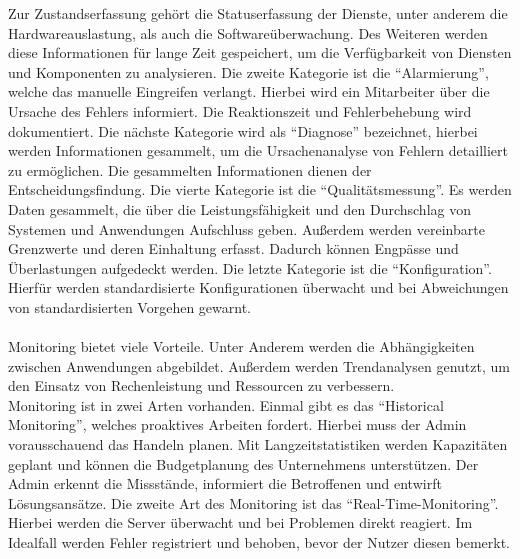 Zur Zustandserfassung gehört die Statuserfassung der Dienste, unter anderem die Hardwareauslastung, als auch die Softwareüberwachung.
Des Weiteren werden diese Informationen für lange Zeit gespeichert, um die Verfügbarkeit von Diensten und Komponenten zu analysieren.
Die zweite Kategorie ist die \enquote{Alarmierung}, welche das manuelle Eingreifen verlangt.
Hierbei wird ein Mitarbeiter über die Ursache des Fehlers informiert.
Die Reaktionszeit und Fehlerbehebung wird dokumentiert.
Die nächste Kategorie wird als \enquote{Diagnose} bezeichnet, hierbei werden Informationen gesammelt, um die Ursachenanalyse von Fehlern detailliert zu ermöglichen.
Die gesammelten Informationen dienen der Entscheidungsfindung.
Die vierte Kategorie ist die \enquote{Qualitätsmessung}.
Es werden Daten gesammelt, die über die Leistungsfähigkeit und den Durchschlag von Systemen und Anwendungen Aufschluss geben.
Außerdem werden vereinbarte Grenzwerte und deren Einhaltung erfasst.
Dadurch können Engpässe und Überlastungen aufgedeckt werden.
Die letzte Kategorie ist die \enquote{Konfiguration}.
Hierfür werden standardisierte Konfigurationen überwacht und bei Abweichungen von standardisierten Vorgehen gewarnt.
\\
\\
Monitoring bietet viele Vorteile.
Unter Anderem werden die Abhängigkeiten zwischen Anwendungen abgebildet.
Außerdem werden Trendanalysen genutzt, um den Einsatz von Rechenleistung und Ressourcen zu verbessern.
\\
Monitoring ist in zwei Arten vorhanden.
Einmal gibt es das \enquote{Historical Monitoring}, welches proaktives Arbeiten fordert.
Hierbei muss der Admin vorausschauend das Handeln planen.
Mit Langzeitstatistiken werden Kapazitäten geplant und können die Budgetplanung des Unternehmens unterstützen.
Der Admin erkennt die Missstände, informiert die Betroffenen und entwirft Lösungsansätze.
Die zweite Art des Monitoring ist das \enquote{Real-Time-Monitoring}.
Hierbei werden die Server überwacht und bei Problemen direkt reagiert.
Im Idealfall werden Fehler registriert und behoben, bevor der Nutzer diesen bemerkt.\autocite{cloudradar, wbs, crossmedia}

